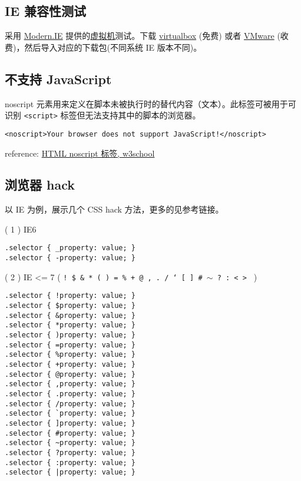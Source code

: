 \subsection{IE 兼容性测试}\hypertarget{ie--1}{}\label{ie--1}

采用 \href{https://dev.modern.ie/}{Modern.IE} 提供的\href{https://dev.modern.ie/tools/vms/windows/}{虚拟机}测试。下载 \href{https://www.virtualbox.org/}{virtualbox} (免费) 或者 \href{http://www.vmware.com/}{VMware} (收费)，然后导入对应的下载包(不同系统 IE 版本不同)。

\subsection{不支持 JavaScript}\hypertarget{javascript}{}\label{javascript}

noscript 元素用来定义在脚本未被执行时的替代内容（文本）。此标签可被用于可识别 \texttt{\textless{}script\textgreater{}} 标签但无法支持其中的脚本的浏览器。

\begin{verbatim}<noscript>Your browser does not support JavaScript!</noscript>
\end{verbatim}

reference: \href{http://www.w3school.com.cn/tags/tag\_noscript.asp}{HTML noscript 标签, w3school}

\subsection{浏览器 hack}\hypertarget{hack}{}\label{hack}

以 IE 为例，展示几个 CSS hack 方法，更多的见参考链接。

( 1 ) IE6

\begin{verbatim}.selector { _property: value; }
.selector { -property: value; }
\end{verbatim}

( 2 ) IE \textless{}= 7 ( \texttt{! \$ \& * ( ) = \% + @ , . / ` [ ] \# \ensuremath{\sim} ? : \textless{} \textgreater{} \textbar{}} )

\begin{verbatim}.selector { !property: value; }
.selector { $property: value; }
.selector { &property: value; }
.selector { *property: value; }
.selector { )property: value; }
.selector { =property: value; }
.selector { %property: value; }
.selector { +property: value; }
.selector { @property: value; }
.selector { ,property: value; }
.selector { .property: value; }
.selector { /property: value; }
.selector { `property: value; }
.selector { ]property: value; }
.selector { #property: value; }
.selector { ~property: value; }
.selector { ?property: value; }
.selector { :property: value; }
.selector { |property: value; }
\end{verbatim}

